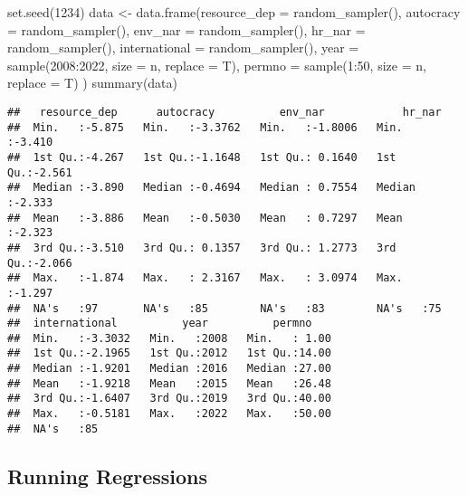 \documentclass[
]{article}
\newenvironment{Shaded}{\begin{snugshade}}{\end{snugshade}}
\newcommand{\AttributeTok}[1]{\textcolor[rgb]{0.77,0.63,0.00}{#1}}
\newcommand{\DecValTok}[1]{\textcolor[rgb]{0.00,0.00,0.81}{#1}}
\newcommand{\FunctionTok}[1]{\textcolor[rgb]{0.00,0.00,0.00}{#1}}
\newcommand{\NormalTok}[1]{#1}
\newcommand{\OtherTok}[1]{\textcolor[rgb]{0.56,0.35,0.01}{#1}}
\newcommand{\SpecialCharTok}[1]{\textcolor[rgb]{0.00,0.00,0.00}{#1}}
\begin{document}
\begin{Shaded}
\begin{Highlighting}[]
\FunctionTok{set.seed}\NormalTok{(}\DecValTok{1234}\NormalTok{)}
\NormalTok{data }\OtherTok{\textless{}{-}} \FunctionTok{data.frame}\NormalTok{(}\AttributeTok{resource\_dep =} \FunctionTok{random\_sampler}\NormalTok{(),}
                   \AttributeTok{autocracy =} \FunctionTok{random\_sampler}\NormalTok{(),}
                   \AttributeTok{env\_nar =} \FunctionTok{random\_sampler}\NormalTok{(),}
                   \AttributeTok{hr\_nar =} \FunctionTok{random\_sampler}\NormalTok{(),}
                   \AttributeTok{international =} \FunctionTok{random\_sampler}\NormalTok{(),}
                   \AttributeTok{year =} \FunctionTok{sample}\NormalTok{(}\DecValTok{2008}\SpecialCharTok{:}\DecValTok{2022}\NormalTok{, }\AttributeTok{size =}\NormalTok{ n, }\AttributeTok{replace =}\NormalTok{ T),}
                   \AttributeTok{permno =} \FunctionTok{sample}\NormalTok{(}\DecValTok{1}\SpecialCharTok{:}\DecValTok{50}\NormalTok{, }\AttributeTok{size =}\NormalTok{ n, }\AttributeTok{replace =}\NormalTok{ T)}
\NormalTok{                   )}
\FunctionTok{summary}\NormalTok{(data)}
\end{Highlighting}
\end{Shaded}

\begin{verbatim}
##   resource_dep      autocracy          env_nar            hr_nar      
##  Min.   :-5.875   Min.   :-3.3762   Min.   :-1.8006   Min.   :-3.410  
##  1st Qu.:-4.267   1st Qu.:-1.1648   1st Qu.: 0.1640   1st Qu.:-2.561  
##  Median :-3.890   Median :-0.4694   Median : 0.7554   Median :-2.333  
##  Mean   :-3.886   Mean   :-0.5030   Mean   : 0.7297   Mean   :-2.323  
##  3rd Qu.:-3.510   3rd Qu.: 0.1357   3rd Qu.: 1.2773   3rd Qu.:-2.066  
##  Max.   :-1.874   Max.   : 2.3167   Max.   : 3.0974   Max.   :-1.297  
##  NA's   :97       NA's   :85        NA's   :83        NA's   :75      
##  international          year          permno     
##  Min.   :-3.3032   Min.   :2008   Min.   : 1.00  
##  1st Qu.:-2.1965   1st Qu.:2012   1st Qu.:14.00  
##  Median :-1.9201   Median :2016   Median :27.00  
##  Mean   :-1.9218   Mean   :2015   Mean   :26.48  
##  3rd Qu.:-1.6407   3rd Qu.:2019   3rd Qu.:40.00  
##  Max.   :-0.5181   Max.   :2022   Max.   :50.00  
##  NA's   :85
\end{verbatim}

\hypertarget{running-regressions}{%
\subsection{Running Regressions}\label{running-regressions}}
\end{document}
